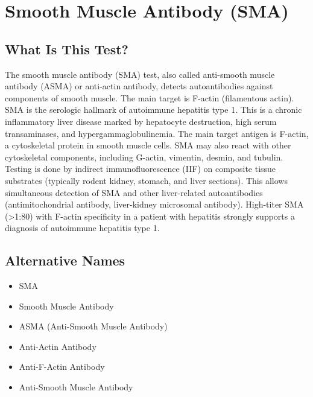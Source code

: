 \chapter{Smooth Muscle Antibody (SMA)}

\section*{What Is This Test?}
The smooth muscle antibody (SMA) test, also called anti-smooth muscle antibody (ASMA) or anti-actin antibody, detects autoantibodies against components of smooth muscle. The main target is F-actin (filamentous actin). SMA is the serologic hallmark of autoimmune hepatitis type 1. This is a chronic inflammatory liver disease marked by hepatocyte destruction, high serum transaminases, and hypergammaglobulinemia. The main target antigen is F-actin, a cytoskeletal protein in smooth muscle cells. SMA may also react with other cytoskeletal components, including G-actin, vimentin, desmin, and tubulin. Testing is done by indirect immunofluorescence (IIF) on composite tissue substrates (typically rodent kidney, stomach, and liver sections). This allows simultaneous detection of SMA and other liver-related autoantibodies (antimitochondrial antibody, liver-kidney microsomal antibody). High-titer SMA (>1:80) with F-actin specificity in a patient with hepatitis strongly supports a diagnosis of autoimmune hepatitis type 1.

\section*{Alternative Names}
\begin{itemize}
  \item SMA
  \item Smooth Muscle Antibody
  \item ASMA (Anti-Smooth Muscle Antibody)
  \item Anti-Actin Antibody
  \item Anti-F-Actin Antibody
  \item Anti-Smooth Muscle Antibody
\end{itemize}
